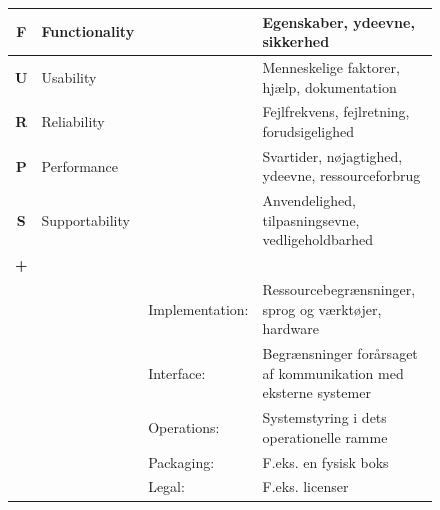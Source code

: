 \begin{figure}[ht]{
    \centering
\begin{tabular}{|c | p{} p{} |p{}|}
       \hline
       \textbf{F}   &   Functionality   &&
       Egenskaber, ydeevne, sikkerhed                   \\
       \hline

       \textbf{U}   &   Usability       &&
       Menneskelige faktorer, hjælp, dokumentation      \\
       \hline

       \textbf{R}   &   Reliability     &&
       Fejlfrekvens, fejlretning, forudsigelighed       \\
       \hline

       \textbf{P}   &   Performance     &&
       Svartider, nøjagtighed, ydeevne, ressourceforbrug                                                      \\
       \hline

       \textbf{S}   &   Supportability  &&
       Anvendelighed, tilpasningsevne, vedligeholdbarhed                                                      \\
       \hline

       \textbf{+}   &                   &&              \\

       &&   Implementation: &   Ressourcebegrænsninger, sprog og værktøjer, hardware                     \\

       &&   Interface:      &   Begrænsninger forårsaget af kommunikation med eksterne systemer              \\

       &&   Operations:     &   Systemstyring i dets operationelle ramme                              \\

       &&   Packaging:      &   F.eks. en fysisk boks   \\

       &&    Legal:         &   F.eks. licenser       \\
       \hline
\end{tabular}}
\end{figure}

